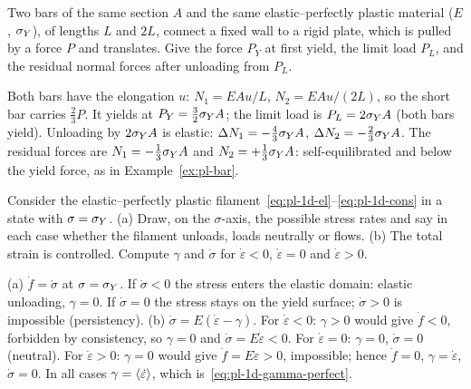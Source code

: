 \label{exo:pl-sq-bars}
%
Two bars of the same section $A$ and the same elastic--perfectly plastic
material ($E$, $\sigma_{Y}$), of lengths $L$ and $2L$, connect a fixed wall to a
rigid plate, which is pulled by a force $P$ and translates. Give the force
$P_Y$ at first yield, the limit load $P_L$, and the residual normal forces
after unloading from $P_L$.
\begin{solution}
Both bars have the elongation $u$: $N_1=EAu/L$, $N_2=EAu/(2L)$, so the short
bar carries $\tfrac23P$. It yields at $P_Y=\tfrac32\sigma_{Y} A$; the limit load is
$P_L=2\sigma_{Y} A$ (both bars yield). Unloading by $2\sigma_{Y} A$ is elastic:
$\Delta N_1=-\tfrac43\sigma_{Y} A$, $\Delta N_2=-\tfrac23\sigma_{Y} A$. The residual forces
are $N_1=-\tfrac13\sigma_{Y} A$ and $N_2=+\tfrac13\sigma_{Y} A$: self-equilibrated and below
the yield force, as in Example~\ref{ex:pl-bar}.
\end{solution}


\label{exo:pl-perfect}
%
Consider the elastic--perfectly plastic filament~\eqref{eq:pl-1d-el}--\eqref{eq:pl-1d-cons}
in a state with $\sigma=\sigma_{Y}$. (a) Draw, on the $\sigma$-axis, the possible
stress rates and say in each case whether the filament unloads, loads
neutrally or flows. (b) The total strain is controlled. Compute $\gamma$ and
$\dot\sigma$ for $\dot\varepsilon<0$, $\dot\varepsilon=0$ and $\dot\varepsilon>0$.
\begin{solution}
(a) $\dot f=\dot\sigma$ at $\sigma=\sigma_{Y}$. If $\dot\sigma<0$ the stress enters
the elastic domain: elastic unloading, $\gamma=0$. If $\dot\sigma=0$ the
stress stays on the yield surface; $\dot\sigma>0$ is impossible (persistency).
(b) $\dot\sigma=E(\dot\varepsilon-\gamma)$. For $\dot\varepsilon<0$:
$\gamma>0$ would give $\dot f<0$, forbidden by consistency, so $\gamma=0$ and
$\dot\sigma=E\dot\varepsilon<0$. For $\dot\varepsilon=0$: $\gamma=0$,
$\dot\sigma=0$ (neutral). For $\dot\varepsilon>0$: $\gamma=0$ would give
$\dot f=E\dot\varepsilon>0$, impossible; hence $\dot f=0$,
$\gamma=\dot\varepsilon$, $\dot\sigma=0$. In all cases
$\gamma=\langle \dot\varepsilon\rangle$, which is~\eqref{eq:pl-1d-gamma-perfect}.
\end{solution}

